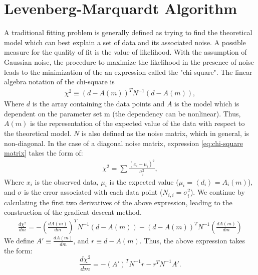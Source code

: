\documentclass[%
 reprint,
 amsmath,amssymb,
 aps,
]{revtex4-2}
\begin{document}
\appendix
\section{Levenberg-Marquardt Algorithm}
A traditional fitting problem is generally defined as trying to find the theoretical model which can best explain a set of data and its associated noise. A possible measure for the quality of fit is the value of likelihood. With the assumption of Gaussian noise, the procedure to maximize the likelihood in the presence of noise leads to the minimization of the 
an expression called the "chi-square". The linear algebra notation of the chi-square is
\begin{gather}
    \chi^2 \equiv \left (d-A\left(m\right)\right)^T N^{-1} \left(d-A\left(m\right)\right),
    \label{eq:chi-square matrix}
\end{gather}
Where $d$ is the array containing the data points and $A$ is the model which is dependent on the parameter set m (the dependency can be nonlinear). Thus, $A(m)$ is the representation of the expected value of the data with respect to the theoretical model. $N$ is also defined as the noise matrix, which in general, is non-diagonal. In the case of a diagonal noise matrix, expression \ref{eq:chi-square matrix} takes the form of:
\begin{gather}
    \chi^2 = \sum \frac {\left(x_i - \mu_i\right)^2}{\sigma^2_{i}},
    \label{eq: chi-sqaure simple}
\end{gather}
Where $x_i$ is the observed data, $\mu_i$ is the expected value ($\mu_i=\left<d_i\right>=A_i\left(m\right)$), and $\sigma$ is the error associated with each data point ($N_{i, i} = \sigma^2_{i}$). We continue by calculating the first two derivatives of the above expression, leading to the construction of the gradient descent method.
\begin{gather}
        \frac{d \chi^2}{dm} = - \left(\frac{dA\left(m\right)}{dm}\right)^T N^{-1} (d-A(m)) - \left(d-A\left(m\right)\right)^T N^{-1} \left(\frac{dA(m)}{dm}\right ) 
\end{gather}
We define $A' \equiv\frac{dA(m)}{dm}$, and $r \equiv d - A(m)$. Thus, the above expression takes the form:
\begin{equation}
    \frac{d \chi^2}{dm} = - \left(A'\right)^T N^{-1} r - r^T N^{-1} A'.
    \label{eq:csq_first_deriv}
\end{equation}
\end{document}
